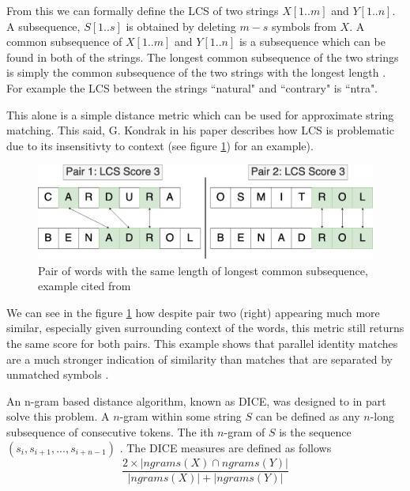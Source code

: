 \documentclass[a4paper,11pt]{article}
\begin{document}
From this we can formally define the LCS of two strings $X[1..m]$ and $Y[1..n]$.
A subsequence, $S[1..s]$ is obtained by deleting $m-s$ symbols from $X$. A common subsequence of $X[1..m]$ and $Y[1..n]$ is a subsequence which can be found in both of the strings. The longest common subsequence of the two strings is simply the common subsequence of the two strings with the longest length \citep{lcsFormalDefinition}.
For example the LCS between the strings ``natural" and ``contrary" is ``ntra".

This alone is a simple distance metric which can be used for approximate string matching. This said, G. Kondrak \citep{ngramDistanceImplementation} in his paper describes how LCS is problematic due to its insensitivty to context (see figure \ref{fig:lcsExample}) for an example).

\begin{figure}[H]
    \centering
    \includegraphics[width=0.9\linewidth]{diagrams/LCSUnrelatedStrings.drawio.png}
    \caption{Pair of words with the same length of longest common subsequence, example cited from \citep{ngramDistanceImplementation}}
    \label{fig:lcsExample}
\end{figure}

We can see in the figure \ref{fig:lcsExample} how despite pair two (right) appearing much more similar, especially given surrounding context of the words, this metric still returns the same score for both pairs. This example shows that parallel identity matches are a much stronger indication of similarity than matches that are separated by unmatched symbols \citep{ngramDistanceImplementation}.

An n-gram based distance algorithm, known as DICE, was designed to in part solve this problem. A $n$-gram within some string $S$ can be defined as any $n$-long subsequence of consecutive tokens. The ith $n$-gram of $S$ is the sequence $(s_i, s_{i+1}, ..., s_{i+n-1})$  \citep{ngramBio}. The DICE measures are defined as follows \citep{ngramDistanceImplementation}
\begin{equation}
    \frac{2 \times | ngrams(X) \cap ngrams(Y)|}{|ngrams(X)| + |ngrams(Y)|}
\end{equation}
\end{document}
